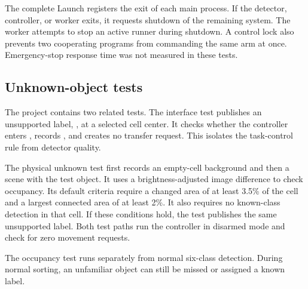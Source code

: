 The complete Launch registers the exit of each main process. If the detector, controller, or worker exits, it requests shutdown of the remaining system. The worker attempts to stop an active runner during shutdown. A control lock also prevents two cooperating programs from commanding the same arm at once. Emergency-stop response time was not measured in these tests.

\subsection{Unknown-object tests}
The project contains two related tests. The interface test publishes an unsupported label, , at a selected cell center. It checks whether the controller enters , records , and creates no transfer request. This isolates the task-control rule from detector quality.

The physical unknown test first records an empty-cell background and then a scene with the test object. It uses a brightness-adjusted image difference to check occupancy. Its default criteria require a changed area of at least 3.5\% of the cell and a largest connected area of at least 2\%. It also requires no known-class detection in that cell. If these conditions hold, the test publishes the same unsupported label. Both test paths run the controller in disarmed mode and check for zero movement requests.

The occupancy test runs separately from normal six-class detection. During normal sorting, an unfamiliar object can still be missed or assigned a known label.

